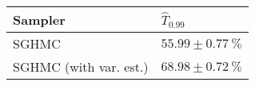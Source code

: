 \begin{tabular}{ll}
\toprule
               Sampler &    $\hat{T}_{0.99}$ \\
\midrule
                 SGHMC & $55.99 \pm 0.77~\%$ \\
SGHMC (with var. est.) & $68.98 \pm 0.72~\%$ \\
\bottomrule
\end{tabular}

